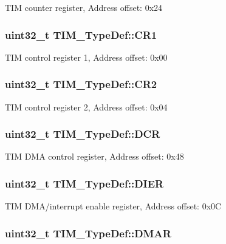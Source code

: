 T\-I\-M counter register, Address offset\-: 0x24 \hypertarget{struct_t_i_m___type_def_a9dafc8b03e8497203a8bb395db865328}{
\subsubsection[{C\-R1}]{ uint32\-\_\-t T\-I\-M\-\_\-\-Type\-Def\-::\-C\-R1}}\label{struct_t_i_m___type_def_a9dafc8b03e8497203a8bb395db865328}
T\-I\-M control register 1, Address offset\-: 0x00 \hypertarget{struct_t_i_m___type_def_a6b1ae85138ed91686bf63699c61ef835}{
\subsubsection[{C\-R2}]{ uint32\-\_\-t T\-I\-M\-\_\-\-Type\-Def\-::\-C\-R2}}\label{struct_t_i_m___type_def_a6b1ae85138ed91686bf63699c61ef835}
T\-I\-M control register 2, Address offset\-: 0x04 \hypertarget{struct_t_i_m___type_def_a7efe9ea8067044cac449ada756ebc2d1}{
\subsubsection[{D\-C\-R}]{ uint32\-\_\-t T\-I\-M\-\_\-\-Type\-Def\-::\-D\-C\-R}}\label{struct_t_i_m___type_def_a7efe9ea8067044cac449ada756ebc2d1}
T\-I\-M D\-M\-A control register, Address offset\-: 0x48 \hypertarget{struct_t_i_m___type_def_a22a33c78ca5bec0e3e8559164a82b8ef}{
\subsubsection[{D\-I\-E\-R}]{ uint32\-\_\-t T\-I\-M\-\_\-\-Type\-Def\-::\-D\-I\-E\-R}}\label{struct_t_i_m___type_def_a22a33c78ca5bec0e3e8559164a82b8ef}
T\-I\-M D\-M\-A/interrupt enable register, Address offset\-: 0x0\-C \hypertarget{struct_t_i_m___type_def_afb7114ac49dba07ba5d250c507dbf23d}{
\subsubsection[{D\-M\-A\-R}]{ uint32\-\_\-t T\-I\-M\-\_\-\-Type\-Def\-::\-D\-M\-A\-R}}\label{struct_t_i_m___type_def_afb7114ac49dba07ba5d250c507dbf23d}
